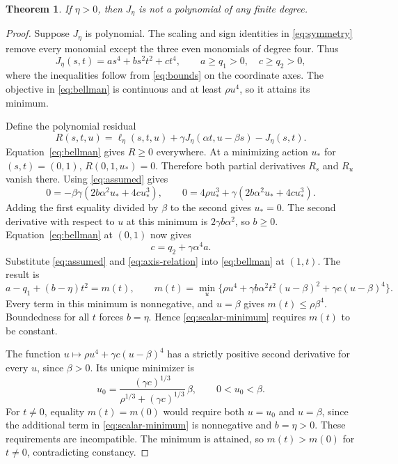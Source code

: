 \documentclass[10pt]{article}
\newtheorem{theorem}{Theorem}
\begin{document}
\begin{theorem}
If $\eta>0$, then $J_\eta$ is not a polynomial of any finite degree.
\label{thm:obstruction}
\end{theorem}
\begin{proof}
Suppose $J_\eta$ is polynomial. The scaling and sign identities in \eqref{eq:symmetry} remove every monomial except the three even monomials of degree four. Thus
\begin{equation}
 J_\eta(s,t)=a s^4+b s^2t^2+c t^4,
 \qquad a\geq q_1>0,\quad c\geq q_2>0,
 \label{eq:assumed}
\end{equation}
where the inequalities follow from \eqref{eq:bounds} on the coordinate axes. The objective in \eqref{eq:bellman} is continuous and at least $\rho u^4$, so it attains its minimum.

Define the polynomial residual
\begin{equation}
 R(s,t,u)=\ell_\eta(s,t,u)+\gamma J_\eta(\alpha t,u-\beta s)-J_\eta(s,t).
 \label{eq:residual}
\end{equation}
Equation~\eqref{eq:bellman} gives $R\geq0$ everywhere. At a minimizing action $u_*$ for $(s,t)=(0,1)$, $R(0,1,u_*)=0$. Therefore both partial derivatives $R_s$ and $R_u$ vanish there. Using \eqref{eq:assumed} gives
\[
 0=-\beta\gamma(2b\alpha^2u_*+4cu_*^3),\qquad
 0=4\rho u_*^3+\gamma(2b\alpha^2u_*+4cu_*^3).
\]
Adding the first equality divided by $\beta$ to the second gives $u_*=0$. The second derivative with respect to $u$ at this minimum is $2\gamma b\alpha^2$, so $b\geq0$. Equation~\eqref{eq:bellman} at $(0,1)$ now gives
\begin{equation}
 c=q_2+\gamma\alpha^4a.
 \label{eq:axis-relation}
\end{equation}
Substitute \eqref{eq:assumed} and \eqref{eq:axis-relation} into \eqref{eq:bellman} at $(1,t)$. The result is
\begin{equation}
 a-q_1+(b-\eta)t^2=m(t),\qquad
 m(t)=\min_u\{\rho u^4+\gamma b\alpha^2t^2(u-\beta)^2
                         +\gamma c(u-\beta)^4\}.
 \label{eq:scalar-minimum}
\end{equation}
Every term in this minimum is nonnegative, and $u=\beta$ gives $m(t)\leq\rho\beta^4$. Boundedness for all $t$ forces $b=\eta$. Hence \eqref{eq:scalar-minimum} requires $m(t)$ to be constant.

The function $u\mapsto\rho u^4+\gamma c(u-\beta)^4$ has a strictly positive second derivative for every $u$, since $\beta>0$. Its unique minimizer is
\[
 u_0=\frac{(\gamma c)^{1/3}}{\rho^{1/3}+(\gamma c)^{1/3}}\,\beta,
 \qquad 0<u_0<\beta.
\]
For $t\ne0$, equality $m(t)=m(0)$ would require both $u=u_0$ and $u=\beta$, since the additional term in \eqref{eq:scalar-minimum} is nonnegative and $b=\eta>0$. These requirements are incompatible. The minimum is attained, so $m(t)>m(0)$ for $t\ne0$, contradicting constancy.
\end{proof}
\end{document}
